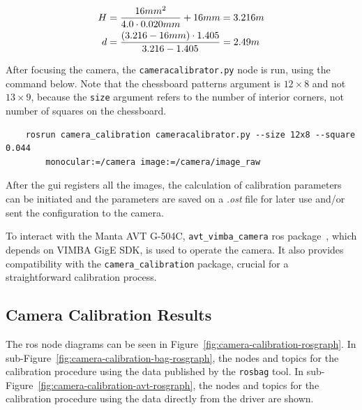 \begin{subequations}
	\label{eq:hyperfocal-and-dof-values}
	\begin{align}
		H & = \frac{16mm^2}{4.0 \cdot 0.020mm} + 16mm  = 3.216 m \label{eq:hyperfocal-distance-value} \\
		\vspace{25mm}
		d & = \frac{(3.216 - 16mm) \cdot 1.405}{3.216 - 1.405} = 2.49m \label{eq:dof-subject-distance-value}
	\end{align}
\end{subequations}

After focusing the camera, the \texttt{cameracalibrator.py} node is run, using the command below. Note that the chessboard patterns argument is $12\times 8$ and not $13 \times 9$, because the \texttt{size} argument refers to the number of interior corners, not number of squares on the chessboard.


\begin{verbatim}
    rosrun camera_calibration cameracalibrator.py --size 12x8 --square 0.044  
        monocular:=/camera image:=/camera/image_raw
\end{verbatim}


After the \ac{gui} registers all the images, the calculation of calibration parameters can be initiated and the parameters are saved on a \textit{.ost} file for later use and/or sent the configuration to the camera. 

To interact with the Manta AVT G-504C, \texttt{avt\_vimba\_camera} \ac{ros} package~\cite{AVTROSdriver}, which depends on VIMBA GigE SDK, is used to operate the camera. It also provides compatibility with the \texttt{camera\_calibration} package, crucial for a straightforward calibration process.

\subsection{Camera Calibration Results}
The \ac{ros} node diagrams can be seen in Figure~\ref{fig:camera-calibration-rosgraph}. In sub-Figure~\ref{fig:camera-calibration-bag-rosgraph}, the nodes and topics for the calibration procedure using the data published by the \texttt{rosbag} tool. In sub-Figure~\ref{fig:camera-calibration-avt-rosgraph}, the nodes and topics for the calibration procedure using the data directly from the driver are shown. 


